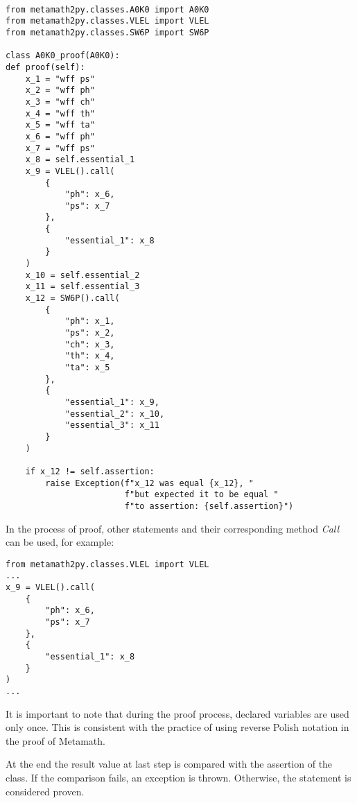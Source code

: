 \begin{verbatim}

from metamath2py.classes.A0K0 import A0K0
from metamath2py.classes.VLEL import VLEL
from metamath2py.classes.SW6P import SW6P

class A0K0_proof(A0K0):
def proof(self):
    x_1 = "wff ps"
    x_2 = "wff ph"
    x_3 = "wff ch"
    x_4 = "wff th"
    x_5 = "wff ta"
    x_6 = "wff ph"
    x_7 = "wff ps"
    x_8 = self.essential_1
    x_9 = VLEL().call(
        {
            "ph": x_6,
            "ps": x_7
        },
        {
            "essential_1": x_8
        }
    )
    x_10 = self.essential_2
    x_11 = self.essential_3
    x_12 = SW6P().call(
        {
            "ph": x_1,
            "ps": x_2,
            "ch": x_3,
            "th": x_4,
            "ta": x_5
        },
        {
            "essential_1": x_9,
            "essential_2": x_10,
            "essential_3": x_11
        }
    )

    if x_12 != self.assertion:
        raise Exception(f"x_12 was equal {x_12}, "
                        f"but expected it to be equal "
                        f"to assertion: {self.assertion}")
\end{verbatim}


In the process of proof, other statements and their corresponding method \textit{Call} can be used, for example:

\begin{verbatim}
from metamath2py.classes.VLEL import VLEL
...
x_9 = VLEL().call(
    {
        "ph": x_6,
        "ps": x_7
    },
    {
        "essential_1": x_8
    }
)
...
\end{verbatim}


It is important to note that during the proof process, declared variables are used only once. This is consistent with the practice of using reverse Polish notation in the proof of Metamath.

At the end the result value at last step is compared with the assertion of the class. If the comparison
fails, an
exception is thrown. Otherwise, the statement is considered proven.


